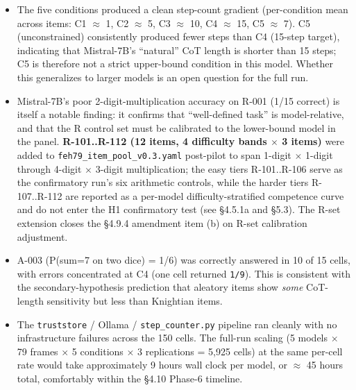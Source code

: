 \documentclass{article}
\providecommand{\tightlist}{\setlength{\itemsep}{0pt}\setlength{\parskip}{0pt}}
\begin{document}
\begin{itemize}
\tightlist
\item
  The five conditions produced a clean step-count gradient
  (per-condition mean across items: C1 \ensuremath{\approx} 1, C2 \ensuremath{\approx} 5, C3 \ensuremath{\approx} 10, C4 \ensuremath{\approx} 15, C5
  \ensuremath{\approx} 7). C5 (unconstrained) consistently produced fewer steps than C4
  (15-step target), indicating that Mistral-7B's ``natural'' CoT length
  is shorter than 15 steps; C5 is therefore not a strict upper-bound
  condition in this model. Whether this generalizes to larger models is
  an open question for the full run.
\item
  Mistral-7B's poor 2-digit-multiplication accuracy on R-001 (1/15
  correct) is itself a notable finding: it confirms that ``well-defined
  task'' is model-relative, and that the R control set must be
  calibrated to the lower-bound model in the panel. \textbf{R-101..R-112
  (12 items, 4 difficulty bands \ensuremath{\times} 3 items)} were added to
  \texttt{feh79\_item\_pool\_v0.3.yaml} post-pilot to span 1-digit \ensuremath{\times}
  1-digit through 4-digit \ensuremath{\times} 3-digit multiplication; the easy tiers
  R-101..R-106 serve as the confirmatory run's six arithmetic controls,
  while the harder tiers R-107..R-112 are reported as a per-model
  difficulty-stratified competence curve and do not enter the H1
  confirmatory test (see \S{}4.5.1a and \S{}5.3). The R-set extension closes
  the \S{}4.9.4 amendment item (b) on R-set calibration adjustment.
\item
  A-003 (P(sum=7 on two dice) = 1/6) was correctly answered in 10 of 15
  cells, with errors concentrated at C4 (one cell returned
  \texttt{1/9}). This is consistent with the secondary-hypothesis
  prediction that aleatory items show \emph{some} CoT-length sensitivity
  but less than Knightian items.
\item
  The \texttt{truststore} / Ollama / \texttt{step\_counter.py} pipeline
  ran cleanly with no infrastructure failures across the 150 cells. The
  full-run scaling (5 models \ensuremath{\times} 79 frames \ensuremath{\times} 5 conditions \ensuremath{\times} 3 replications
  = 5,925 cells) at the same per-cell rate would take approximately 9
  hours wall clock per model, or \ensuremath{\approx} 45 hours total, comfortably within
  the \S{}4.10 Phase-6 timeline.
\end{itemize}
\end{document}

